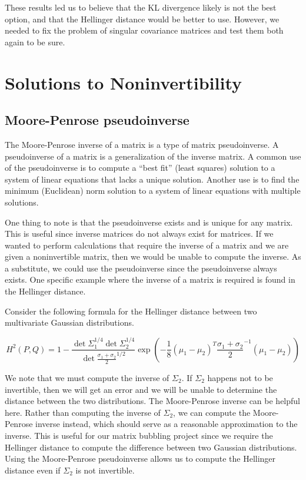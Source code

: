 \documentclass{article}
\newcommand*{\Pn}[1]{\left( #1 \right)}
\begin{document}
These results led us to believe that the KL divergence likely is not the best option, and that the Hellinger distance would be better to use. However, we needed to fix the problem of singular covariance matrices and test them both again to be sure.

\section{Solutions to Noninvertibility}

\subsection{Moore-Penrose pseudoinverse}

The Moore-Penrose inverse of a matrix is a type of matrix pseudoinverse.\cite{wikimoore} A pseudoinverse of a matrix is a generalization of the inverse matrix. A common use of the pseudoinverse is to compute a ``best fit'' (least squares) solution to a system of linear equations that lacks a unique solution. Another use is to find the minimum (Euclidean) norm solution to a system of linear equations with multiple solutions.

One thing to note is that the pseudoinverse exists and is unique for any matrix. This is useful since inverse matrices do not always exist for matrices. If we wanted to perform calculations that require the inverse of a matrix and we are given a noninvertible matrix, then we would be unable to compute the inverse. As a substitute, we could use the pseudoinverse since the pseudoinverse always exists. One specific example where the inverse of a matrix is required is found in the Hellinger distance.

Consider the following formula for the Hellinger distance between two multivariate Gaussian distributions.

\begin{equation}
    H^2(P,Q)=1-\frac{\det\Sigma_1^{1/4}\det\Sigma_2^{1/4}}{\det \frac{\sigma_1+\sigma_2}{2}^{1/2}}
    \exp\Pn{-\frac18(\mu_1-\mu_2)^T\frac{\sigma_1+\sigma_2}{2}^{-1}(\mu_1-\mu_2)}
\end{equation}

We note that we must compute the inverse of $\Sigma_2$. If $\Sigma_2$ happens not to be invertible, then we will get an error and we will be unable to determine the distance between the two distributions. The Moore-Penrose inverse can be helpful here. Rather than computing the inverse of $\Sigma_2$, we can compute the Moore-Penrose inverse instead, which should serve as a reasonable approximation to the inverse. This is useful for our matrix bubbling project since we require the Hellinger distance to compute the difference between two Gaussian distributions. Using the Moore-Penrose pseudoinverse allows us to compute the Hellinger distance even if $\Sigma_2$ is not invertible.
\end{document}
